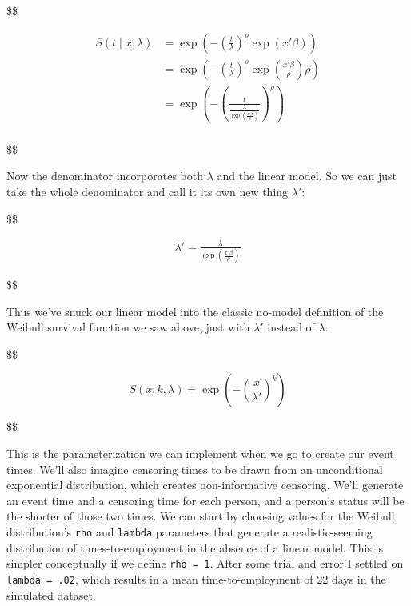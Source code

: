 \documentclass[
  letterpaper,
  DIV=11,
  numbers=noendperiod]{scrreprt}
\begin{document}
\$\$

\begin{align*}
S(t \mid x, \lambda) &= \exp\left(-\left(\frac{t}{\lambda}\right)^{\rho} \exp(x' \beta)\right) \\
&= \exp\left(-\left(\frac{t}{\lambda}\right)^{\rho} \exp\left(\frac{x' \beta}{\rho}\right)\rho\right) \\
&= \exp\left(-\left(\frac{t}{\frac{\lambda}{\exp\left(\frac{x' \beta}{\rho}\right)}}\right)^{\rho}\right) \\
\end{align*}

\$\$

Now the denominator incorporates both \(\lambda\) and the linear model.
So we can just take the whole denominator and call it its own new thing
\(\lambda'\):

\$\$

\begin{align*}
\lambda' = \frac{\lambda}{\exp\left(\frac{x' \beta}{\rho}\right)}
\end{align*}

\$\$

Thus we've snuck our linear model into the classic no-model definition
of the Weibull survival function we saw above, just with \(\lambda'\)
instead of \(\lambda\):

\$\$

\begin{equation}
S(x; k, \lambda) = \exp\left(-\left(\frac{x}{\lambda'}\right)^{k}\right)
\end{equation}

\$\$

This is the parameterization we can implement when we go to create our
event times. We'll also imagine censoring times to be drawn from an
unconditional exponential distribution, which creates non-informative
censoring. We'll generate an event time and a censoring time for each
person, and a person's status will be the shorter of those two times. We
can start by choosing values for the Weibull distribution's \texttt{rho}
and \texttt{lambda} parameters that generate a realistic-seeming
distribution of times-to-employment in the absence of a linear model.
This is simpler conceptually if we define \texttt{rho\ =\ 1}. After some
trial and error I settled on \texttt{lambda\ =\ .02}, which results in a
mean time-to-employment of 22 days in the simulated dataset.
\end{document}
